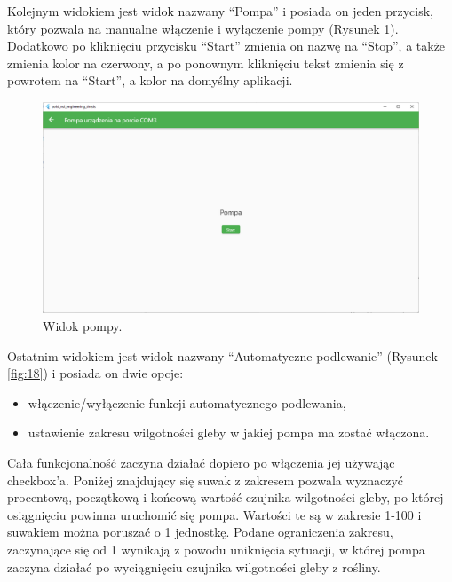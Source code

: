 \documentclass[a4paper,twoside,12pt]{book}
\begin{document}
Kolejnym widokiem jest widok nazwany ``Pompa'' i posiada on jeden przycisk, który pozwala na manualne włączenie i wyłączenie pompy (Rysunek \ref{fig:17}). Dodatkowo po kliknięciu przycisku ``Start'' zmienia on nazwę na ``Stop'', a także zmienia kolor na czerwony, a po ponownym kliknięciu tekst zmienia się z powrotem na ``Start'', a kolor na domyślny aplikacji.

\begin{figure}[H]
   \centering
   \includegraphics[width=\textwidth]{./assets/img/img017.png}
   \caption{Widok pompy.}
   \label{fig:17}
\end{figure}

Ostatnim widokiem jest widok nazwany ``Automatyczne podlewanie'' (Rysunek \ref{fig:18}) i posiada on dwie opcje:

\begin{itemize}
   \item włączenie/wyłączenie funkcji automatycznego podlewania,
   \item ustawienie zakresu wilgotności gleby w jakiej pompa ma zostać włączona.
\end{itemize}

Cała funkcjonalność zaczyna działać dopiero po włączenia jej używając checkbox'a. Poniżej znajdujący się suwak z zakresem pozwala wyznaczyć procentową, początkową i końcową wartość czujnika wilgotności gleby, po której osiągnięciu powinna uruchomić się pompa. Wartości te są w zakresie 1-100 i suwakiem można poruszać o 1 jednostkę. Podane ograniczenia zakresu, zaczynające się od 1 wynikają z powodu uniknięcia sytuacji, w której pompa zaczyna działać po wyciągnięciu czujnika wilgotności gleby z rośliny.
\end{document}
